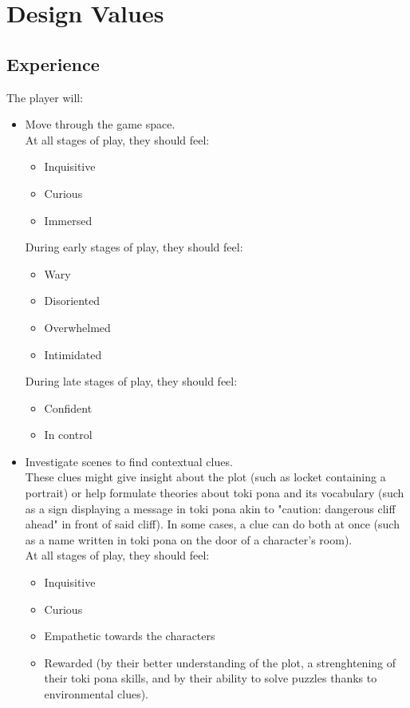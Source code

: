 \documentclass{scrartcl}
\begin{document}
	\section{Design Values}
		\subsection{Experience}
		The player will:
		\begin{itemize}
			\item Move through the game space. \\
			At all stages of play, they should feel:
			\begin{itemize}
				\item Inquisitive
				\item Curious
				\item Immersed
			\end{itemize}
			During early stages of play, they should feel: 
			\begin{itemize}
				\item Wary
				\item Disoriented
				\item Overwhelmed
				\item Intimidated
			\end{itemize}
			During late stages of play, they should feel:
			\begin{itemize}
				\item Confident
				\item In control
			\end{itemize}
			\item Investigate scenes to find contextual clues. \\
			These clues might give insight about the plot (such as locket containing a portrait) or help formulate theories about toki pona and its vocabulary (such as a sign displaying a message in toki pona akin to "caution: dangerous cliff ahead" in front of said cliff). In some cases, a clue can do both at once (such as a name written in toki pona on the door of a character's room).\\
			At all stages of play, they should feel:
			\begin{itemize}
				\item Inquisitive
				\item Curious
				\item Empathetic towards the characters
				\item Rewarded (by their better understanding of the plot, a strenghtening of their toki pona skills, and by their ability to solve puzzles thanks to environmental clues).

\end{itemize}
\end{itemize}
\end{document}
